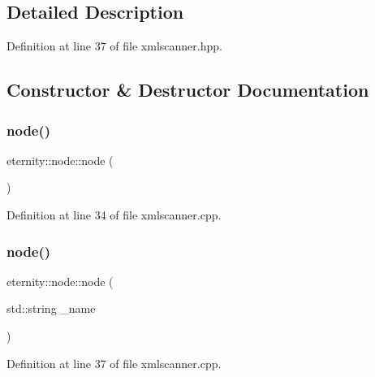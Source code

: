 \subsection{Detailed Description}


Definition at line 37 of file xmlscanner.\+hpp.



\subsection{Constructor \& Destructor Documentation}
\mbox{\label{classeternity_1_1node_a8aab11da45324aff3018c80a3b489e47}} 
\subsubsection{\texorpdfstring{node()}{node()}\hspace{0.1cm}{\footnotesize\ttfamily [1/3]}}
{\footnotesize\ttfamily eternity\+::node\+::node (\begin{DoxyParamCaption}{ }\end{DoxyParamCaption})}



Definition at line 34 of file xmlscanner.\+cpp.

\mbox{\label{classeternity_1_1node_ad95115f371bc4d91338735dd1c168b77}} 
\subsubsection{\texorpdfstring{node()}{node()}\hspace{0.1cm}{\footnotesize\ttfamily [2/3]}}
{\footnotesize\ttfamily eternity\+::node\+::node (\begin{DoxyParamCaption}\item[{std\+::string}]{\+\_\+name }\end{DoxyParamCaption})}



Definition at line 37 of file xmlscanner.\+cpp.

\mbox{\label{classeternity_1_1node_aee2ebc23f893fed356c9c4c123842283}} 

